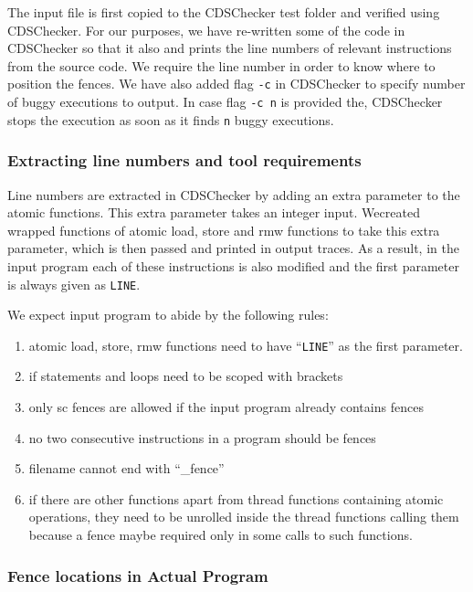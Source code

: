 The input file is first copied to the CDSChecker test folder and 
verified using CDSChecker. 
For our purposes, we have re-written some of the code in CDSChecker 
so that it also and prints the line numbers of relevant instructions 
from the source code. We require the line number in order to know 
where to position the fences. We have also added flag \texttt{-c} 
in CDSChecker to specify number of buggy executions to output. In 
case flag \texttt{-c n} is provided the, CDSChecker stops the execution 
as soon as it finds \texttt{n} buggy executions.


\subsubsection{Extracting line numbers and tool requirements}
Line numbers are extracted in CDSChecker by adding an extra parameter 
to the atomic functions. This extra parameter takes an integer input. 
Wecreated wrapped functions of atomic load, store and rmw functions 
to take this extra parameter, which is then passed and printed in 
output traces. As a result, in the input program each of these 
instructions is also modified and the first parameter is always 
given as {\tt{\textunderscore\textunderscore LINE\textunderscore\textunderscore}}.

We expect input program to abide by the following rules:
\begin{enumerate}
	\item atomic load, store, rmw functions need to have 
	``{\tt{\textunderscore\textunderscore LINE\textunderscore\textunderscore}}'' 
	as the first parameter.
	\item if statements and loops need to be scoped with 
	brackets %
	\item only sc fences are allowed if the input program 
	already contains fences
	\item no two consecutive instructions in a program should be fences 
	\item filename cannot end with ``\_fence''
	\item if there are other functions apart from thread functions 
	containing atomic operations, they need to be unrolled inside the 
	thread functions calling them because a fence maybe required only 
	in some calls to such functions.
\end{enumerate}

\subsubsection{Fence locations in Actual Program}\

